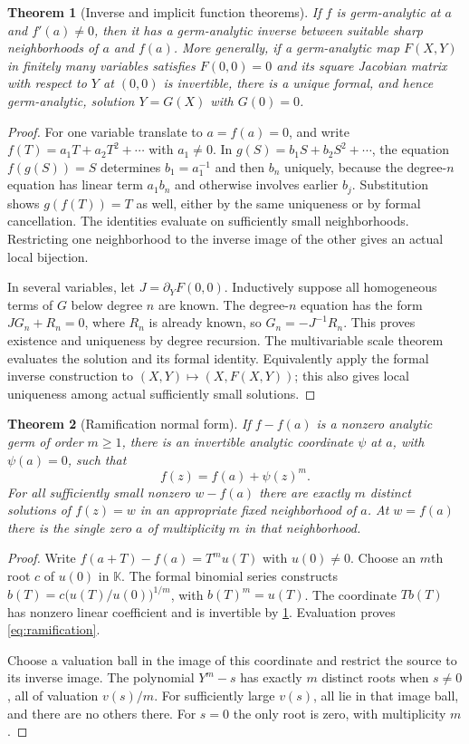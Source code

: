 \documentclass[11pt,a4paper]{article}
\numberwithin{equation}{section}
\newtheorem{theorem}{Theorem}[section]
\theoremstyle{definition}
\newcommand{\K}{\mathbb K}
\begin{document}
\begin{theorem}[Inverse and implicit function theorems]\label{thm:inverse}
If $f$ is germ-analytic at $a$ and $f'(a)\neq0$, then it has a germ-analytic
inverse between suitable sharp neighborhoods of $a$ and $f(a)$.
More generally, if a germ-analytic map $F(X,Y)$ in finitely many variables
satisfies $F(0,0)=0$ and its square Jacobian matrix with respect to $Y$ at
$(0,0)$ is invertible, there is a unique formal, and hence germ-analytic,
solution $Y=G(X)$ with $G(0)=0$.
\end{theorem}
\begin{proof}
For one variable translate to $a=f(a)=0$, and write
$f(T)=a_1T+a_2T^2+\cdots$ with $a_1\neq0$. In
$g(S)=b_1S+b_2S^2+\cdots$, the equation $f(g(S))=S$ determines
$b_1=a_1^{-1}$ and then $b_n$ uniquely, because the degree-$n$ equation has
linear term $a_1b_n$ and otherwise involves earlier $b_j$. Substitution shows
$g(f(T))=T$ as well, either by the same uniqueness or by formal cancellation.
The identities evaluate on sufficiently small neighborhoods. Restricting
one neighborhood to the inverse image of the other gives an actual local
bijection.

In several variables, let $J=\partial_YF(0,0)$. Inductively suppose all
homogeneous terms of $G$ below degree $n$ are known. The degree-$n$ equation
has the form $JG_n+R_n=0$, where $R_n$ is already known, so
$G_n=-J^{-1}R_n$. This proves existence and uniqueness by degree recursion.
The multivariable scale theorem evaluates the solution and its formal identity.
Equivalently apply the formal inverse construction to $(X,Y)\mapsto(X,F(X,Y))$;
this also gives local uniqueness among actual sufficiently small solutions.
\end{proof}

\begin{theorem}[Ramification normal form]\label{thm:normalform}
If $f-f(a)$ is a nonzero analytic germ of order $m\geq1$, there is an invertible
analytic coordinate $\psi$ at $a$, with $\psi(a)=0$, such that
\begin{equation}\label{eq:ramification}
 f(z)=f(a)+\psi(z)^m.
\end{equation}
For all sufficiently small nonzero $w-f(a)$ there are exactly $m$ distinct
solutions of $f(z)=w$ in an appropriate fixed neighborhood of $a$.
At $w=f(a)$ there is the single zero $a$ of multiplicity $m$ in that neighborhood.
\end{theorem}
\begin{proof}
Write $f(a+T)-f(a)=T^m u(T)$ with $u(0)\neq0$. Choose an $m$th root
$c$ of $u(0)$ in $\K$. The formal binomial series constructs
$b(T)=c\bigl(u(T)/u(0)\bigr)^{1/m}$, with $b(T)^m=u(T)$.
The coordinate $Tb(T)$ has nonzero linear coefficient and is invertible by
\cref{thm:inverse}. Evaluation proves \eqref{eq:ramification}.

Choose a valuation ball in the image of this coordinate and restrict the
source to its inverse image. The polynomial $Y^m-s$ has exactly $m$ distinct
roots when $s\neq0$, all of valuation $v(s)/m$. For sufficiently large $v(s)$,
all lie in that image ball, and there are no others there. For $s=0$ the
only root is zero, with multiplicity $m$.
\end{proof}
\end{document}
